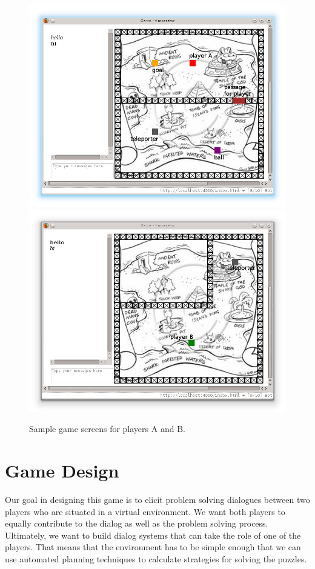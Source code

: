 

\begin{figure}
\includegraphics[scale=0.4]{player1_new_with_label.png} 
\includegraphics[scale=0.4]{player2_new_with_label.png}
\caption{Sample game screens for players A and B.}
\label{fig:player-screenshots}
\end{figure}

\section{Game Design}

Our goal in designing this game is to elicit problem solving
dialogues between two players who are situated in a virtual
environment. We want both players to equally contribute to the dialog
as well as the problem solving process.  Ultimately, we want to build
dialog systems that can take the role of one of the players. That
means that the environment has to be simple enough that we can use
automated planning techniques to calculate strategies for solving the
puzzles.

